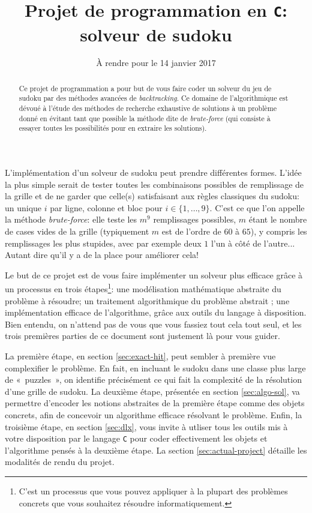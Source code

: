 \documentclass[french,a4paper]{article}
\title{Projet de programmation en {\tt C}:\\
  solveur de sudoku}
\date{\`A rendre pour le 14 janvier 2017}
\author{}
\theoremstyle{definition}
\theoremstyle{remark}
\begin{document}
\begin{abstract}
  Ce projet de programmation a pour but de vous faire coder un solveur
  du jeu de sudoku par des méthodes avancées de {\em backtracking}. Ce
  domaine de l'algorithmique est dévoué à l'étude des méthodes de
  recherche exhaustive de solutions à un problème donné en évitant
  tant que possible la méthode dite de {\em brute-force} (qui consiste
  à essayer toutes les possibilités pour en extraire les solutions).
\end{abstract}

\maketitle


L'implémentation d'un solveur de sudoku peut prendre différentes
formes. L'idée la plus simple serait de tester toutes les combinaisons
possibles de remplissage de la grille et de ne garder que celle(s)
satisfaisant aux règles classiques du sudoku: un unique $i$ par ligne,
colonne et bloc pour $i \in \{1,\dots,9\}$. C'est ce que l'on appelle
la méthode {\em brute-force}: elle teste les $m^9$ remplissages
possibles, $m$ étant le nombre de cases vides de la grille
(typiquement $m$ est de l'ordre de $60$ à $65$), y compris les
remplissages les plus stupides, avec par exemple deux $1$ l'un
à côté de l'autre... Autant dire qu'il y a de la place pour améliorer
cela!

Le but de ce projet est de vous faire implémenter un solveur plus
efficace grâce à un processus en trois étapes\footnote{C'est un
  processus que vous pouvez appliquer à la plupart des problèmes
  concrets que vous souhaitez résoudre informatiquement.}: une
modélisation mathématique abstraite du problème à résoudre; un
traitement algorithmique du problème abstrait ; une implémentation
efficace de l'algorithme, grâce aux outils du langage à
disposition. Bien entendu, on n'attend pas de vous que vous fassiez
tout cela tout seul, et les trois premières parties de ce document
sont justement là pour vous guider.

La première étape, en section \ref{sec:exact-hit}, peut sembler à
première vue complexifier le problème. En fait, en incluant le sudoku
dans une classe plus large de «~puzzles~», on identifie précisément ce
qui fait la complexité de la résolution d'une grille de sudoku. La
deuxième étape, présentée en section \ref{sec:algo-sol}, va permettre
d'encoder les notions abstraites de la première étape comme des objets
concrets, afin de concevoir un algorithme efficace résolvant le
problème. Enfin, la troisième étape, en section \ref{sec:dlx}, vous
invite à utliser tous les outils mis à votre disposition par le
langage {\tt C} pour coder effectivement les objets et l'algorithme
pensés à la deuxième étape. La section \ref{sec:actual-project}
détaille les modalités de rendu du projet.
\end{document}
